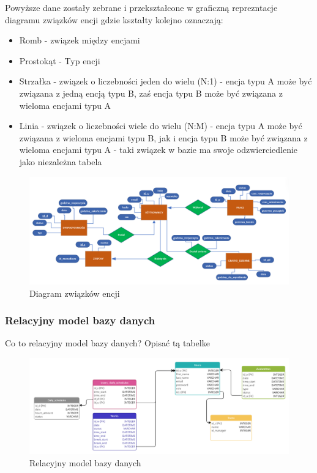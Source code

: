 Powyższe dane zostały zebrane i przekształcone w graficzną reprezntacje diagramu związków encji
gdzie kształty kolejno oznaczają:
\begin{itemize}
 \item Romb - związek między encjami
 \item Prostokąt - Typ encji
 \item Strzałka - związek o liczebności jeden do wielu (N:1) - encja typu A może być związana z jedną encją typu B, zaś encja typu B może być związana z wieloma encjami typu A
 \item Linia - związek o liczebności wiele do wielu (N:M) - encja typu A może być związana z wieloma encjami typu B, jak i encja typu B może być związana z wieloma encjami typu A - taki związek w bazie ma swoje odzwierciedlenie jako niezależna tabela
\end{itemize}

\begin{figure}[htbp]
    \centering
    \includegraphics[width=1\textwidth]{Rozdziały/Opis zaprojektowanego systemu/Podrozdziały/DataBase.png}  %
    \caption{Diagram związków encji}  %
    \label{fig:nazwa_etkiety}  %
\end{figure}


\subsubsection{Relacyjny model bazy danych}

Co to relacyjny model bazy danych?
Opisać tą tabelke 

\begin{figure}[htbp]
    \centering
    \includegraphics[width=1\textwidth]{Rozdziały/Opis zaprojektowanego systemu/Podrozdziały/DataBaseEN.png}  %
    \caption{Relacyjny model bazy danych}  %
    \label{fig:nazwa_etkiety}  %
\end{figure}


